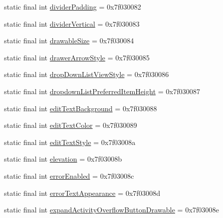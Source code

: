 \begin{DoxyCompactItemize}
static final int \mbox{\hyperlink{classandroid_1_1support_1_1design_1_1R_1_1attr_aa232cfdd1a85b48a7020e02ae3feaaca}{divider\+Padding}} = 0x7f030082
\item 
static final int \mbox{\hyperlink{classandroid_1_1support_1_1design_1_1R_1_1attr_ad9bff20984b9b305919aaf3b1a699315}{divider\+Vertical}} = 0x7f030083
\item 
static final int \mbox{\hyperlink{classandroid_1_1support_1_1design_1_1R_1_1attr_a752d7489bf25759f26da0de7051c6d6c}{drawable\+Size}} = 0x7f030084
\item 
static final int \mbox{\hyperlink{classandroid_1_1support_1_1design_1_1R_1_1attr_a067fc22595374f6cf79df43697f707d0}{drawer\+Arrow\+Style}} = 0x7f030085
\item 
static final int \mbox{\hyperlink{classandroid_1_1support_1_1design_1_1R_1_1attr_aecae50e199b147d3412c64228e7ffbfa}{drop\+Down\+List\+View\+Style}} = 0x7f030086
\item 
static final int \mbox{\hyperlink{classandroid_1_1support_1_1design_1_1R_1_1attr_a9771b11e6d5d4f3ac5339bfa4afb5bdf}{dropdown\+List\+Preferred\+Item\+Height}} = 0x7f030087
\item 
static final int \mbox{\hyperlink{classandroid_1_1support_1_1design_1_1R_1_1attr_ae5151ecdcfbdc46e6e424c79b60548ee}{edit\+Text\+Background}} = 0x7f030088
\item 
static final int \mbox{\hyperlink{classandroid_1_1support_1_1design_1_1R_1_1attr_ae5bffd7d1a0defcc8af0a2d675908267}{edit\+Text\+Color}} = 0x7f030089
\item 
static final int \mbox{\hyperlink{classandroid_1_1support_1_1design_1_1R_1_1attr_ac21901da73b034db7da8b6598b5954a5}{edit\+Text\+Style}} = 0x7f03008a
\item 
static final int \mbox{\hyperlink{classandroid_1_1support_1_1design_1_1R_1_1attr_a32597814963a4ec5dd120c66e7ac7f15}{elevation}} = 0x7f03008b
\item 
static final int \mbox{\hyperlink{classandroid_1_1support_1_1design_1_1R_1_1attr_a33177626e9eac6ee0f334023420ed888}{error\+Enabled}} = 0x7f03008c
\item 
static final int \mbox{\hyperlink{classandroid_1_1support_1_1design_1_1R_1_1attr_aff80f59fbd99ca8b22758a04767ac7d5}{error\+Text\+Appearance}} = 0x7f03008d
\item 
static final int \mbox{\hyperlink{classandroid_1_1support_1_1design_1_1R_1_1attr_a294fef173d17119d81a2a22e1b059994}{expand\+Activity\+Overflow\+Button\+Drawable}} = 0x7f03008e
\item 

\end{DoxyCompactItemize}
